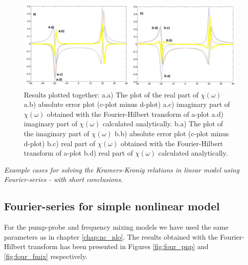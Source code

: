 \documentclass[12pt,twoside,a4paper]{article}
\numberwithin{equation}{subsection}
\numberwithin{figure}{subsection}
\begin{document}
\begin{figure} 
  \includegraphics[width=150mm]{img/four_lin.png}
  \caption{Results plotted together: 
   a.a) The plot of the real part of $\chi (\omega )$ 
   a.b) absolute error plot (c-plot minus d-plot) 
   a.c) imaginary part of $\chi (\omega )$ obtained with the Fourier-Hilbert transform of a-plot 
   a.d) imaginary part of $\chi (\omega )$  calculated analytically. 
   b.a) The plot of the imaginary part of $\chi (\omega )$ 
   b.b) absolute error plot (c-plot minus d-plot) 
   b.c) real part of $\chi (\omega )$ obtained with the Fourier-Hilbert transform of a-plot 
   b.d) real part of $\chi (\omega )$ calculated analytically. \label{fig:four_lin}
  }
\end{figure} 

\textit{Example cases for solving the Kramers-Kronig relations in linear model using Fourier-series - with short conclusions.}

\subsection{Fourier-series for simple nonlinear model} \label{chap:fourier_nlo}

For the pump-probe and frequency mixing models we have used the same parameters as in chapter \ref{chap:nc_nlo}. The results
obtained with the Fourier-Hilbert transform has been presented in Figures \ref{fig:four_pnp} and \ref{fig:four_fmix}
respectively.
\end{document}
